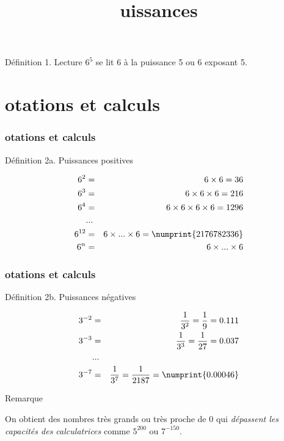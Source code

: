 \documentclass{beamer}
\title{\rmfamily{\textsc{P}}uissances}
\begin{document}
\frame{\titlepage}

\begin{frame}
  \begin{alertblock}{Définition 1. Lecture}
        $6^5$ se lit 6 à la puissance 5 ou 6 exposant 5.
  \end{alertblock}
\end{frame}

\section{otations et calculs}

\begin{frame}
  \frametitle{otations et calculs}

  \begin{alertblock}{Définition 2a. Puissances positives}

    \begin{eqnarray*}
      6^2 &=& 6 \times 6 = 36\\
      6^3 &=& 6 \times 6 \times 6 = 216\\
      6^4 &=& 6 \times 6 \times 6 \times 6 = 1296\\
      &...& \\
      6^{12} &=& 6 \times ... \times 6 = \numprint{2 176 782 336} \\
      6^n &=& 6 \times ... \times 6
    \end{eqnarray*}
   
  \end{alertblock}
\end{frame}


\begin{frame}
  \frametitle{otations et calculs}

  \begin{alertblock}{Définition 2b. Puissances négatives}

    \begin{eqnarray*}
      3^{-2} &=& \dfrac{1}{3^{2}} = \dfrac{1}{9} = 0.111\\
      3^{-3} &=& \dfrac{1}{3^{3}} = \dfrac{1}{27} = 0.037\\
      &...& \\
      3^{-7} &=& \dfrac{1}{3^{7}} = \dfrac{1}{2187} = \numprint{0.00046}
    \end{eqnarray*}

  \end{alertblock}

  \begin{exampleblock}{Remarque}

On obtient des nombres très grands ou très proche de 0 qui \textit{dépassent les capacités des calculatrices} comme $5^{200}$ ou $7^{-150}$.

  \end{exampleblock}

\end{frame}
\end{document}
